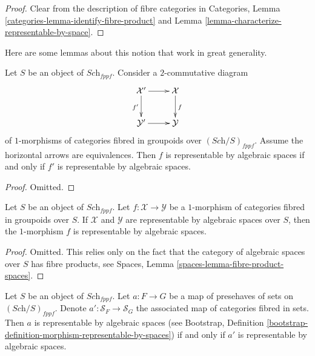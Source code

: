 \begin{proof}
Clear from the description of fibre categories in
Categories, Lemma \ref{categories-lemma-identify-fibre-product}
and Lemma \ref{lemma-characterize-representable-by-space}.
\end{proof}

\noindent
Here are some lemmas about this notion that work in great generality.

\begin{lemma}
\label{lemma-representable-by-spaces-morphism-equivalent}
Let $S$ be an object of $\textit{Sch}_{fppf}$.
Consider a $2$-commutative diagram
$$
\xymatrix{
\mathcal{X}' \ar[r] \ar[d]_{f'} & \mathcal{X} \ar[d]^f \\
\mathcal{Y}' \ar[r] & \mathcal{Y}
}
$$
of $1$-morphisms of categories fibred in groupoids over
$(\textit{Sch}/S)_{fppf}$.
Assume the horizontal arrows are equivalences.
Then $f$ is representable by algebraic spaces
if and only if $f'$ is representable by algebraic spaces.
\end{lemma}

\begin{proof}
Omitted.
\end{proof}

\begin{lemma}
\label{lemma-morphism-spaces-gives-representable-by-spaces}
Let $S$ be an object of $\textit{Sch}_{fppf}$.
Let $f : \mathcal{X} \to \mathcal{Y}$
be a $1$-morphism of categories fibred in groupoids over $S$.
If $\mathcal{X}$ and $\mathcal{Y}$ are representable by
algebraic spaces over $S$, then the $1$-morphism $f$
is representable by algebraic spaces.
\end{lemma}

\begin{proof}
Omitted. This relies only on the fact that
the category of algebraic spaces over $S$ has fibre products,
see Spaces, Lemma \ref{spaces-lemma-fibre-product-spaces}.
\end{proof}

\begin{lemma}
\label{lemma-map-presheaves-representable-by-algebraic-spaces}
Let $S$ be an object of $\textit{Sch}_{fppf}$.
Let $a : F \to G$ be a map of presehaves of sets on $(\textit{Sch}/S)_{fppf}$.
Denote $a' : \mathcal{S}_F  \to \mathcal{S}_G$ the associated
map of categories fibred in sets.
Then $a$ is representable by algebraic spaces (see
Bootstrap,
Definition \ref{bootstrap-definition-morphism-representable-by-spaces})
if and only if $a'$ is representable by algebraic spaces.
\end{lemma}

